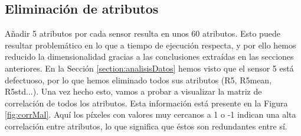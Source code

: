 \documentclass{esannV2}
\begin{document}
\subsection{Eliminación de atributos}\label{section:eliminacionAtributos}
Añadir 5 atributos por cada sensor resulta en unos 60 atributos. Esto puede resultar problemático en lo que a tiempo de ejecución respecta, y por ello hemos reducido la dimensionalidad gracias a las conclusiones extraídas en las secciones anteriores.
\newline\newline
En la Sección \ref{section:analisisDatos} hemos visto que el sensor 5 está defectuoso, por lo que hemos eliminado todos sus atributos (R5, R5mean, R5std...).
\newline
Una vez hecho esto, vamos a probar a visualizar la matriz de correlación de todos los atributos. Esta información está presente en la Figura \ref{fig:corrMal}. Aquí los píxeles con valores muy cercanos a 1 o -1 indican una alta correlación entre atributos, lo que significa que éstos son redundantes entre sí.
\end{document}
